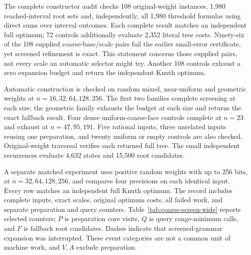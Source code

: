 \documentclass[11pt]{article}
\begin{document}
The complete constructor audit checks 108 original-weight instances,
1,980 reached-interval root sets and, independently, all 1,980 threshold
formulas using direct sums over interval outcomes. Each complete result
matches an independent full optimum; 72 controls additionally evaluate
2,352 literal tree costs. Ninety-six of the 108 supplied coarse-base/scale
pairs fail the earlier small-error certificate, yet screened refinement
is exact. This statement concerns those supplied pairs, not every scale
an automatic selector might try. Another 108 controls exhaust a zero
expansion budget and return the independent Knuth optimum.

Automatic construction is checked on random mixed, near-uniform and
geometric weights at $n=16,32,64,128,256$. The first two families complete
screening at each size; the geometric family exhausts the budget at each
size and returns the exact fallback result. Four dense uniform-coarse-face
controls complete at $n=23$ and exhaust at $n=47,95,191$. Five rational
inputs, three unrelated inputs reusing one preparation, and twenty uniform
or empty controls are also checked. Original-weight traversal verifies
each returned full tree. The small independent recurrences evaluate
4,632 states and 15,500 root candidates.

A separate matched experiment uses positive random weights with up to
256 bits, at $n=32,64,128,256$, and compares four precisions on each
identical input. Every row matches an independent full Knuth optimum.
The record includes complete inputs, exact scales, original optimum costs,
all failed work, and separate preparation and query counters. Table~\ref{tab:coarse-screen-wide}
reports selected counters; $P$ is preparation core visits, $Q$ is query
range-minimum calls, and $F$ is fallback root candidates. Dashes indicate
that screened-grammar expansion was interrupted. These event categories
are not a common unit of machine work, and $V,A$ exclude preparation.
\end{document}
